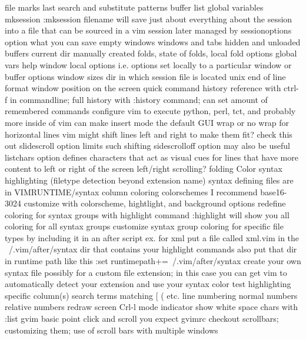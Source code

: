 \documentclass[12pt]{book}
\begin{document}
{        file marks
        last search and substitute patterns
        buffer list
        global variables
    mksession
      :mksession filename will save just about everything about the session into a file that can be sourced in a vim session later
      managed by sessionoptions option
      what you can save
        empty windows
        windows and tabs
        hidden and unloaded buffers
        current dir
        manually created folds, state of folds, local fold options
        global vars
        help window
        local options i.e. options set locally to a particular window or buffer
        options
        window sizes
        dir in which session file is located
        unix end of line format
        window position on the screen
  quick command history reference with ctrl-f in commandline; full history with :history command; can set amount of remembered commands
  configure vim to execute python, perl, tct, and probably more inside of vim
  can make insert mode the default
GUI
  wrap or no wrap for horizontal lines
    vim might shift lines left and right to make them fit? check this out
    slidescroll option limits such shifting
    sidescrolloff option may also be useful
    listchars option defines characters that act as visual cues for lines that have more content to left or right of the screen
  left/right scrolling?
  folding
  Color
    syntax highlighting (filetype detection beyond extension name)
      syntax defining files are in VIMRUNTIME/syntax
    column coloring
    colorschemes
      I recommend base16-3024
      customize with colorscheme, hightlight, and background options
      redefine coloring for syntax groups with highlight command
      :highlight will show you all coloring for all syntax groups
      customize syntax group coloring for specific file types by including it in an after script
        ex. for xml put a file called xml.vim in the ~/.vim/after/syntax dir that contains your highlight commands
        also put that dir in runtime path like this :set runtimepath+=~/.vim/after/syntax
      create your own syntax file
        possibly for a custom file extension; in this case you can get vim to automatically detect your extension and use your syntax
    color test
  highlighting
    specific column(s)
    search terms
    matching { [ ( etc.
  line numbering
    normal numbers
    relative numbers
  redraw screen Crl-l
  mode indicator
  show white space chars with :list
  gvim
    basic point click and scroll you expect
    gvimrc
    checkout scrollbars; customizing them; use of scroll bars with multiple windows
}}
\end{document}
